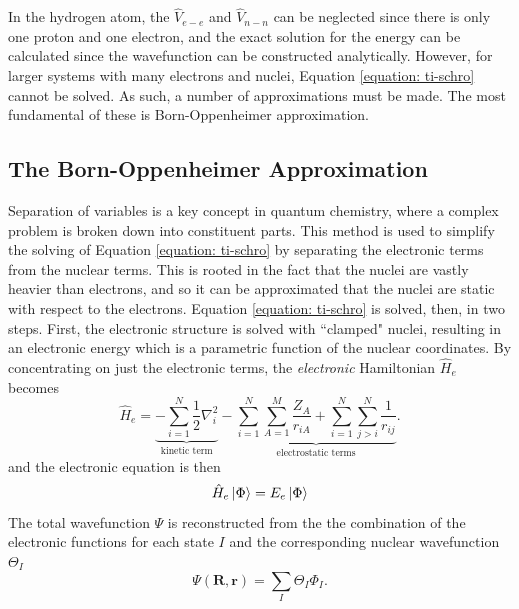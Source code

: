 In the hydrogen atom, the $\hat{V}_{e-e}$ and $\hat{V}_{n-n}$ can be neglected since there is only one proton and one electron, and the exact solution for the energy can be calculated since the wavefunction can be constructed analytically. However, for larger systems with many electrons and nuclei, Equation \ref{equation: ti-schro} cannot be solved. As such, a number of approximations must be made. The most fundamental of these is Born-Oppenheimer approximation.
\subsection{The Born-Oppenheimer Approximation}\label{section: QM_bornoppenheimer}
Separation of variables is a key concept in quantum chemistry, where a complex problem is broken down into constituent parts. This method is used to simplify the solving of Equation \ref{equation: ti-schro} by separating the electronic terms from the nuclear terms. This is rooted in the fact that the nuclei are vastly heavier than electrons, and so it can be approximated that the nuclei are static with respect to the electrons. Equation \ref{equation: ti-schro} is solved, then, in two steps. First, the electronic structure is solved with ``clamped" nuclei, resulting in an electronic energy which is a parametric function of the nuclear coordinates. By concentrating on just the electronic terms, the \textit{electronic} Hamiltonian $\hat{H}_{e}$ becomes
\begin{equation}\label{equation: Hel}
     \hat{H}_{e}=\underbrace{-\sum_{i=1}^{N}\frac{1}{2}\nabla_{i}^2}_\text{kinetic term}-\underbrace{\sum_{i=1}^{N}\sum_{A=1}^{M}\frac{Z_{A}}{r_{iA}}+\sum_{i=1}^{N}\sum_{j>{i}}^{N}\frac{1}{r_{ij}}}_\text{electrostatic terms}.
\end{equation}
and the electronic \schro{} equation is then
\begin{equation}\label{equation: ti-schro-el}
   \hat{H}_{e}\ket{\Phi}=E_{e}\ket{\Phi}
\end{equation}
The total wavefunction $\Psi$ is reconstructed from the the combination of the electronic functions for each state $I$ and the corresponding nuclear wavefunction $\Theta_{I}$
\begin{equation}
    \Psi(\bm{R},\bm{r})=\sum_{I}\Theta_{I}\Phi_{I}.
\end{equation}


